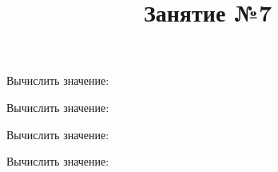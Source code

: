 \begin{listofex}
		\item Вычислить значение:
	\begin{enumcols}[itemcolumns=3]
		\item {}
		\item {}
		\item {}
		\item {}
		\item {}
		\item {}
	\end{enumcols}
\item Вычислить значение:
\begin{enumcols}[itemcolumns=1]
	\item {}
	\item {}
	\item {}
\end{enumcols}
	\item Вычислить значение:
	\begin{enumcols}[itemcolumns=2]
		\item {}
		\item {}
		\item {}
		\item {}
		\item {}
	\end{enumcols}
	\item Вычислить значение:
	\begin{enumcols}[itemcolumns=2]
		\item {}
		\item {}
		\item {}
	\end{enumcols}
	\item {}
	\item {}
	\item {}
\end{listofex}
\newpage
\title{Занятие №7}
